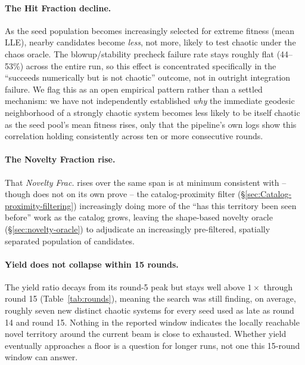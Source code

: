 \documentclass[11pt]{article}
\begin{document}
\paragraph{The Hit Fraction decline.} As the seed population becomes increasingly
selected for extreme fitness (mean LLE), nearby candidates become
\emph{less}, not more, likely to test chaotic under the chaos oracle. The
blowup/stability precheck failure rate stays roughly flat (44--53\%) across
the entire run, so this effect is concentrated specifically in the ``succeeds
numerically but is not chaotic'' outcome, not in outright integration
failure. We flag this as an open empirical pattern rather than a settled
mechanism: we have not independently established \emph{why} the immediate
geodesic neighborhood of a strongly chaotic system becomes less likely to be
itself chaotic as the seed pool's mean fitness rises, only that the
pipeline's own logs show this correlation holding consistently across ten or
more consecutive rounds.

\paragraph{The Novelty Fraction rise.} That \emph{Novelty Frac.} rises over the same
span is at minimum consistent with -- though does not on its own prove -- the
catalog-proximity filter (\S\ref{sec:Catalog-proximity-filtering}) increasingly doing more of the ``has this
territory been seen before'' work as the catalog grows, leaving the
shape-based novelty oracle (\S\ref{sec:novelty-oracle}) to adjudicate an
increasingly pre-filtered, spatially separated population of candidates.

\paragraph{Yield does not collapse within 15 rounds.} The yield ratio decays
from its round-5 peak but stays well above $1\times$ through round 15
(Table~\ref{tab:rounds}), meaning the search was still finding, on average,
roughly seven new distinct chaotic systems for every seed used as late as
round 14 and round 15. Nothing in the reported window indicates the locally reachable
novel territory around the current beam is close to exhausted. Whether yield
eventually approaches a floor is a question for longer runs, not one this
15-round window can answer.
\end{document}
